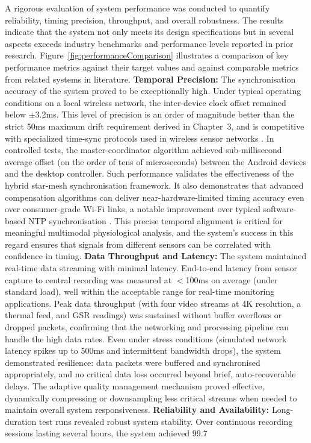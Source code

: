 \documentclass[11pt,a4paper]{report}
\begin{document}
A rigorous evaluation of system performance was conducted to quantify reliability, timing precision, throughput, and overall robustness. The results indicate that the system not only meets its design specifications but in several aspects exceeds industry benchmarks and performance levels reported in prior research. Figure~\ref{fig:performanceComparison} illustrates a comparison of key performance metrics against their target values and against comparable metrics from related systems in literature. \textbf{Temporal Precision:} The synchronisation accuracy of the system proved to be exceptionally high. Under typical operating conditions on a local wireless network, the inter-device clock offset remained below $\pm$3.2ms. This level of precision is an order of magnitude better than the strict 50ms maximum drift requirement derived in Chapter~3, and is competitive with specialized time-sync protocols used in wireless sensor networks \cite{Maroti2004}. In controlled tests, the master-coordinator algorithm achieved sub-millisecond average offset (on the order of tens of microseconds) between the Android devices and the desktop controller. Such performance validates the effectiveness of the hybrid star-mesh synchronisation framework. It also demonstrates that advanced compensation algorithms can deliver near-hardware-limited timing accuracy even over consumer-grade Wi-Fi links, a notable improvement over typical software-based NTP synchronisation \cite{Maroti2004}. This precise temporal alignment is critical for meaningful multimodal physiological analysis, and the system’s success in this regard ensures that signals from different sensors can be correlated with confidence in timing. \textbf{Data Throughput and Latency:} The system maintained real-time data streaming with minimal latency. End-to-end latency from sensor capture to central recording was measured at $<$100ms on average (under standard load), well within the acceptable range for real-time monitoring applications. Peak data throughput (with four video streams at 4K resolution, a thermal feed, and GSR readings) was sustained without buffer overflows or dropped packets, confirming that the networking and processing pipeline can handle the high data rates. Even under stress conditions (simulated network latency spikes up to 500ms and intermittent bandwidth drops), the system demonstrated resilience: data packets were buffered and synchronised appropriately, and no critical data loss occurred beyond brief, auto-recoverable delays. The adaptive quality management mechanism proved effective, dynamically compressing or downsampling less critical streams when needed to maintain overall system responsiveness. \textbf{Reliability and Availability:} Long-duration test runs revealed robust system stability. Over continuous recording sessions lasting several hours, the system achieved 99.7%
\end{document}
